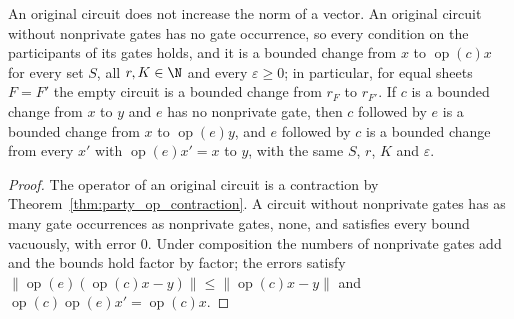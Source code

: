 \begin{theorem}
    \label{thm:party_bounded_change_basic}
    \leanok
    An original circuit does not increase the norm of a vector. An original circuit without
    nonprivate gates has no gate occurrence, so every condition on the participants of its gates
    holds, and it is a bounded change from $x$ to $\operatorname{op}(c)x$ for every set $S$, all
    $r,K\in\N$ and every $\varepsilon\geq0$; in particular, for equal sheets $F=F'$ the empty
    circuit is a bounded change from $r_F$ to $r_{F'}$. If $c$ is a bounded change from $x$ to $y$
    and $e$ has no nonprivate gate, then $c$ followed by $e$ is a bounded change from $x$ to
    $\operatorname{op}(e)y$, and $e$ followed by $c$ is a bounded change from every $x'$ with
    $\operatorname{op}(e)x'=x$ to $y$, with the same $S$, $r$, $K$ and $\varepsilon$.
\end{theorem}
\begin{proof}\leanok
    The operator of an original circuit is a contraction by
    Theorem~\ref{thm:party_op_contraction}. A circuit without nonprivate gates has as many gate
    occurrences as nonprivate gates, none, and satisfies every bound vacuously, with error $0$.
    Under composition the numbers of nonprivate gates add and the bounds hold factor by factor;
    the errors satisfy
    $\lVert\operatorname{op}(e)(\operatorname{op}(c)x-y)\rVert\leq\lVert\operatorname{op}(c)x-y\rVert$
    and $\operatorname{op}(c)\operatorname{op}(e)x'=\operatorname{op}(c)x$.
\end{proof}


